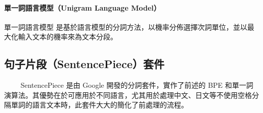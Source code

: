 \paragraph{單一詞語言模型（Unigram Language Model）}

單一詞語言模型 \cite{kudo2018subword} 是基於語言模型的分詞方法，以機率分佈選擇次詞單位，並以最大化輸入文本的機率來為文本分段。


\subsection{句子片段（SentencePiece）套件}

　　
SentencePiece \cite{kudo_sentencepiece_2018}
是由 Google 開發的分詞套件，實作了前述的 BPE 和單一詞演算法。其優勢在於可應用於不同語言，尤其用於處理中文、日文等不使用空格分隔單詞的語言文本時，此套件大大的簡化了前處理的流程。



